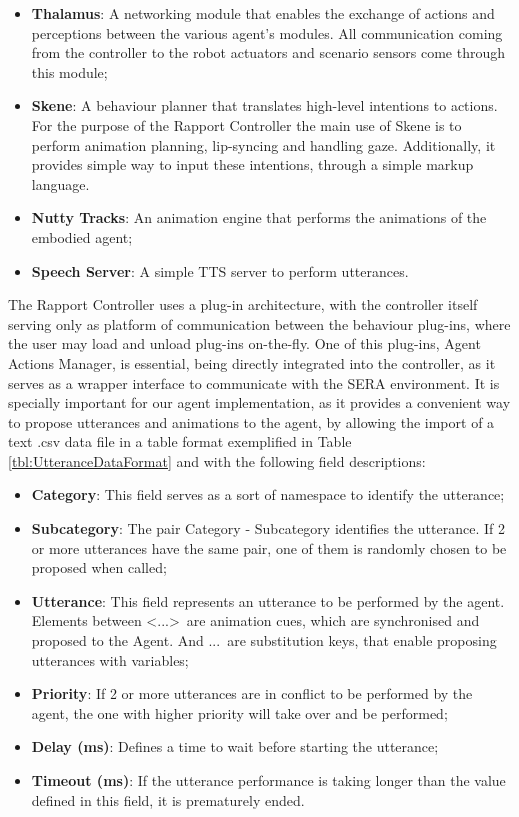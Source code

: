\begin{itemize}
    \item \textbf{Thalamus}: A networking module that enables the exchange of actions and perceptions between the various agent's modules. All communication coming from the controller to the robot actuators and scenario sensors come through this module;
    \item \textbf{Skene}: A behaviour planner that translates high-level intentions to actions. For the purpose of the Rapport Controller the main use of Skene is to perform animation planning, lip-syncing and handling gaze. Additionally, it provides simple way to input these intentions, through a simple markup language.
    \item \textbf{Nutty Tracks}: An animation engine that performs the animations of the embodied agent;
    \item \textbf{Speech Server}: A simple \ac{TTS} server to perform utterances.
\end{itemize}
              
The Rapport Controller uses a plug-in architecture, with the controller itself serving only as platform of communication between the behaviour plug-ins, where the user may load and unload plug-ins on-the-fly. One of this plug-ins, Agent Actions Manager, is essential, being directly integrated into the controller, as it serves as a wrapper interface to communicate with the SERA environment. It is specially important for our agent implementation, as it provides a convenient way to propose utterances and animations to the agent, by allowing the import of a text .csv data file in a table format exemplified in Table \ref{tbl:UtteranceDataFormat} and with the following field descriptions:

\begin{itemize}
    \item \textbf{Category}: This field serves as a sort of namespace to identify the utterance;
    \item \textbf{Subcategory}: The pair Category - Subcategory identifies the utterance. If 2 or more utterances have the same pair, one of them is randomly chosen to be proposed when called;
    \item \textbf{Utterance}: This field represents an utterance to be performed by the agent. Elements between \textless...\textgreater\ are animation cues, which are synchronised and proposed to the Agent. And \textbar...\textbar\ are substitution keys, that enable proposing utterances with variables;
    \item \textbf{Priority}: If 2 or more utterances are in conflict to be performed by the agent, the one with higher priority will take over and be performed;
    \item \textbf{Delay (ms)}: Defines a time to wait before starting the utterance;
    \item \textbf{Timeout (ms)}: If the utterance performance is taking longer than the value defined in this field, it is prematurely ended. 
\end{itemize}

